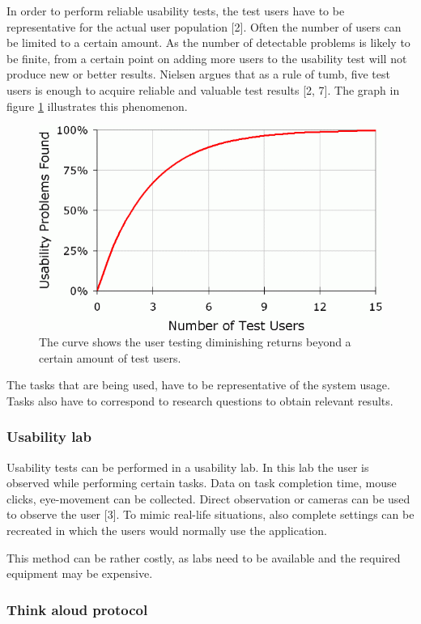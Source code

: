 In order to perform reliable usability tests, the test users have to be representative for the actual user population [2]. Often the number of users can be limited to a certain amount. As the number of detectable problems is likely to be finite, from a certain point on adding more users to the usability test will not produce new or better results. Nielsen argues that as a rule of tumb, five test users is enough to acquire reliable and valuable test results [2, 7]. The graph in figure \ref{figure:diminishing_returns} illustrates this phenomenon.

\begin{figure}[H]
	\begin{center}
		\includegraphics[width=0.6\columnwidth]{img/software-design/user-testing-diminshing-returns-curve}
		\caption{The curve shows the user testing diminishing returns beyond a certain amount of test users.}
		\label{figure:diminishing_returns}
	\end{center}
\end{figure}


The tasks that are being used, have to be representative of the system usage. Tasks also have to correspond to research questions to obtain relevant results.


\subsubsection{Usability lab}

Usability tests can be performed in a usability lab. In this lab the user is observed while performing certain tasks. Data on task completion time, mouse clicks, eye-movement can be collected. Direct observation or cameras can be used to observe the user [3]. To mimic real-life situations, also complete settings can be recreated in which the users would normally use the application.

This method can be rather costly, as labs need to be available and the required equipment may be expensive.


\subsubsection{Think aloud protocol}

